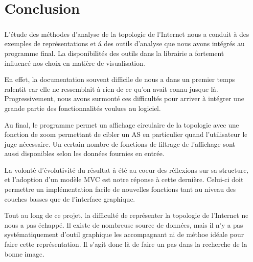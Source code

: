 \section*{Conclusion}

\subparagraph{}
L'\'etude des m\'ethodes d'analyse de la topologie de l'Internet nous a conduit \`a des exemples de repr\'esentations et \'a des outils d'analyse que nous avons int\'egr\'es au programme final.
La  disponibilit\'es des outils dans la librairie \boost a fortement influenc\'e nos choix en mati\`ere de visualisation.

En effet, la documentation souvent difficile de \boost nous a dans un premier temps ralentit car elle ne ressemblait \`a rien de ce qu'on avait connu jusque l\`a. Progressivement, nous avons surmont\'e ces difficult\'es pour arriver \`a int\'egrer une grande partie des fonctionnalit\'es voulues au logiciel.

Au final, le programme permet un affichage circulaire de la topologie avec une fonction de zoom permettant de cibler un AS en particulier quand l'utilisateur le juge n\'ecessaire. Un certain nombre de fonctions de filtrage de l'affichage sont aussi disponibles selon les donn\'ees fournies en entr\'ee.

La volont\'e d'\'evolutivit\'e du r\'esultat \`a \'et\'e au coeur des r\'eflexions sur sa structure, et l'adoption d'un mod\`ele MVC est notre r\'eponse \`a cette derni\`ere. Celui-ci doit permettre un impl\'ementation facile de nouvelles fonctions tant au niveau des couches basses que de l'interface graphique.

Tout au long de ce projet, la difficult\'e de repr\'esenter la topologie de l'Internet ne nous a pas \'echapp\'e. Il existe de nombreuse source de donn\'ees, mais il n'y a pas syst\'ematiquement d'outil graphique les accompagnant ni de m\'ethoe id\'eale pour faire cette repr\'esentation. Il s'agit donc l\`a de faire un pas dans la recherche de la bonne image.